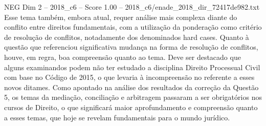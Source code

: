 \begin{textsample}{NEG Dim 2 – 2018\_c6 – Score 1.00 – 2018\_c6/enade\_2018\_dir\_72417de982.txt}
Esse tema também, embora atual, requer análise mais complexa diante do conflito entre direitos fundamentais, com a utilização da ponderação como critério de resolução de conflitos, notadamente dos denominados hard cases.
Quanto à questão que referenciou significativa mudança na forma de resolução de conflitos, houve, em regra, boa compreensão quanto ao tema.
Deve ser destacado que alguns examinandos podem não ter estudado a disciplina Direito Processual Civil com base no Código de 2015, o que levaria à incompreensão no referente a esses novos ditames.
Como apontado na análise dos resultados da correção da Questão 5, os temas da mediação, conciliação e arbitragem passaram a ser obrigatórios nos cursos de Direito, o que significará maior aprofundamento e compreensão quanto a esses temas, que hoje se revelam fundamentais para o mundo jurídico.

\end{textsample}
